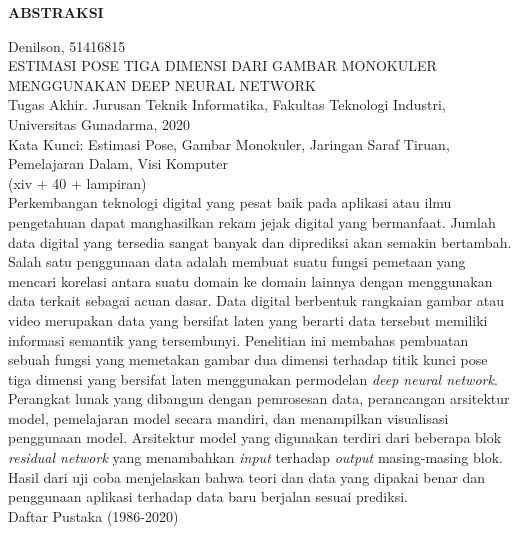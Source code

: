 \newpage %
\begin{center}
    \begin{large}\textbf{ABSTRAKSI}\end{large}
\end{center}

\vspace{5mm}

\noindent Denilson, 51416815 \\
ESTIMASI POSE TIGA DIMENSI DARI GAMBAR MONOKULER MENGGUNAKAN DEEP NEURAL NETWORK\\
Tugas Akhir. Jurusan Teknik Informatika, Fakultas Teknologi Industri, \\
Universitas Gunadarma, 2020\\
Kata Kunci: Estimasi Pose, Gambar Monokuler, Jaringan Saraf Tiruan, Pemelajaran Dalam, Visi Komputer\\
\noindent (xiv + 40 + lampiran)\\

Perkembangan teknologi digital yang pesat baik pada aplikasi atau ilmu pengetahuan dapat
manghasilkan rekam jejak digital yang bermanfaat. Jumlah data digital yang tersedia sangat
banyak dan diprediksi akan semakin bertambah. Salah satu penggunaan data adalah membuat
suatu fungsi pemetaan yang mencari korelasi antara suatu domain ke domain lainnya dengan
menggunakan data terkait sebagai acuan dasar. Data digital berbentuk rangkaian gambar atau video
merupakan data yang bersifat laten yang berarti data tersebut memiliki informasi semantik yang
tersembunyi. Penelitian ini membahas pembuatan sebuah fungsi yang memetakan gambar dua dimensi
terhadap titik kunci pose tiga dimensi yang bersifat laten menggunakan permodelan
\textit{deep neural network}. Perangkat lunak yang dibangun dengan pemrosesan data,
perancangan arsitektur model, pemelajaran model secara mandiri, dan menampilkan visualisasi
penggunaan model. Arsitektur model yang digunakan terdiri dari beberapa blok \textit{residual network}
yang menambahkan \textit{input} terhadap \textit{output} masing-masing blok. Hasil dari uji coba menjelaskan
bahwa teori dan data yang dipakai benar dan penggunaan aplikasi terhadap data baru berjalan
sesuai prediksi.\\


\noindent Daftar Pustaka (1986-2020)
